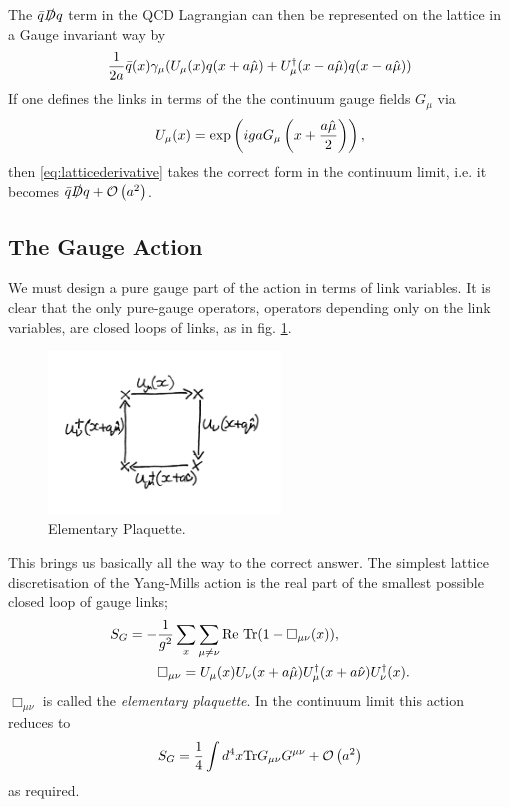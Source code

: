 The $\bar{q}\slashed{D}q$ term in the QCD Lagrangian can then be represented on the lattice in a Gauge invariant way by
\begin{align}
  {1\over 2a}\bar{q}(x) \gamma_{\mu}(U_{\mu}(x)q(x+a\hat{\mu}) + U^{\dagger}_{\mu}(x-a\hat{\mu})q(x-a\hat{\mu}) )
  \label{eq:latticederivative}
\end{align}
If one defines the links in terms of the the continuum gauge fields $G_{\mu}$ via
\begin{align}
  U_{\mu}(x) = \exp\left( iga G_{\mu}\left(x+{a\hat{\mu}\over2}\right) \right),
\end{align}
then \eqref{eq:latticederivative} takes the correct form in the continuum limit, i.e. it becomes $\bar{q}\slashed{D}q + \mathcal{O}\left( a^2 \right)$.

\subsection{The Gauge Action}

We must design a pure gauge part of the action in terms of link variables. It is clear that the only pure-gauge operators, operators depending only on the link variables, are closed loops of links, as in fig. \ref{fig:plaquette}.

\begin{figure}
  \begin{center}
    \vspace{-10pt}
    \includegraphics[width=0.55\textwidth]{images/plaquette.jpg}
    \caption{Elementary Plaquette. \label{fig:plaquette}}
    \vspace{-20pt}
  \end{center}
\end{figure}

This brings us basically all the way to the correct answer. The simplest lattice discretisation of the Yang-Mills action is the real part of the smallest possible closed loop of gauge links;
\begin{align}
  S_G = - &{1\over g^2} \sum_x \sum_{\mu\neq \nu} \text{Re Tr} (1-\Box_{\mu\nu}(x)), \\
  &\Box_{\mu\nu} = U_{\mu}(x)U_{\nu}(x+a\hat{\mu}) U^{\dagger}_{\mu}(x+a\hat{\nu}) U^{\dagger}_{\nu}(x).
  \label{eq:wilson_gauge_action}
\end{align}
$\Box_{\mu\nu}$ is called the {\it{elementary plaquette}}. In the continuum limit this action reduces to
\begin{align}
  S_G = {1\over 4} \int d^4x \text{Tr}G_{\mu\nu}G^{\mu\nu} + \mathcal{O}\left( a^2 \right)
\end{align}
as required.

